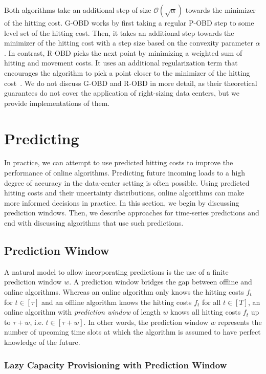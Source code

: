 Both algorithms take an additional step of size $\mathcal{O}(\sqrt{\alpha})$ towards the minimizer of the hitting cost. G-OBD works by first taking a regular P-OBD step to some level set of the hitting cost. Then, it takes an additional step towards the minimizer of the hitting cost with a step size based on the convexity parameter $\alpha$. In contrast, R-OBD picks the next point by minimizing a weighted sum of hitting and movement costs. It uses an additional regularization term that encourages the algorithm to pick a point closer to the minimizer of the hitting cost~\cite{Goel2019}. We do not discuss G-OBD and R-OBD in more detail, as their theoretical guarantees do not cover the application of right-sizing data centers, but we provide implementations of them.

\section{Predicting}\label{section:online_algorithms:md:predictions}

In practice, we can attempt to use predicted hitting costs to improve the performance of online algorithms. Predicting future incoming loads to a high degree of accuracy in the data-center setting is often possible. Using predicted hitting costs and their uncertainty distributions, online algorithms can make more informed decisions in practice. In this section, we begin by discussing prediction windows. Then, we describe approaches for time-series predictions and end with discussing algorithms that use such predictions.

\subsection{Prediction Window}

A natural model to allow incorporating predictions is the use of a finite prediction window $w$. A prediction window bridges the gap between offline and online algorithms. Whereas an online algorithm only knows the hitting costs $f_t$ for $t \in [\tau]$ and an offline algorithm knows the hitting costs $f_t$ for all $t \in [T]$, an online algorithm with \emph{prediction window} of length $w$ knows all hitting costs $f_t$ up to $\tau + w$, i.e. $t \in [\tau + w]$. In other words, the prediction window $w$ represents the number of upcoming time slots at which the algorithm is assumed to have perfect knowledge of the future.

\subsubsection{Lazy Capacity Provisioning with Prediction Window}

